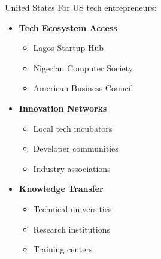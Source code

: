 \begin{regionalbox}{United States}
For US tech entrepreneurs:

\begin{itemize}
    \item \textbf{Tech Ecosystem Access}
    \begin{itemize}
        \item Lagos Startup Hub
        \item Nigerian Computer Society
        \item American Business Council
    \end{itemize}

    \item \textbf{Innovation Networks}
    \begin{itemize}
        \item Local tech incubators
        \item Developer communities
        \item Industry associations
    \end{itemize}

    \item \textbf{Knowledge Transfer}
    \begin{itemize}
        \item Technical universities
        \item Research institutions
        \item Training centers
    \end{itemize}
\end{itemize}
\end{regionalbox}

